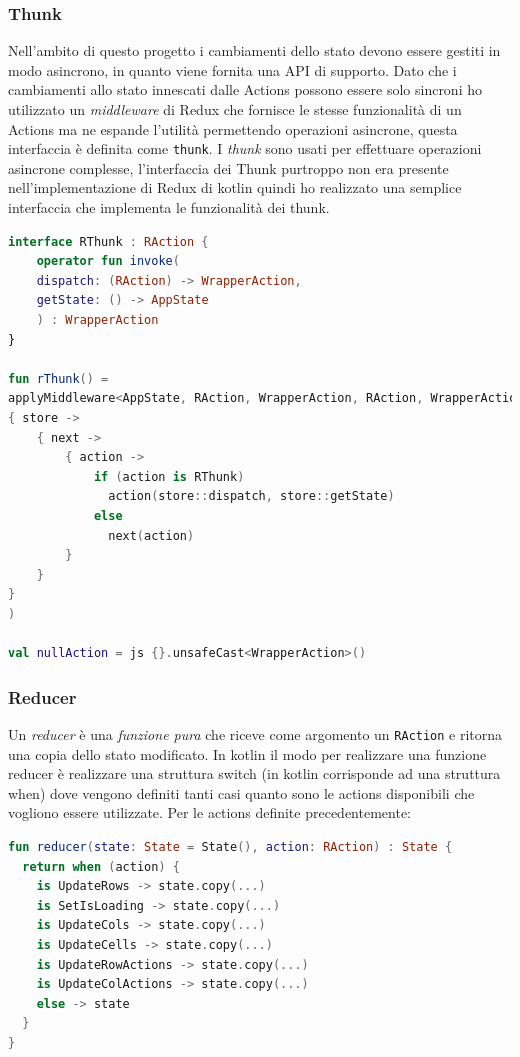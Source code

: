 \subsubsection*{Thunk}
Nell'ambito di questo progetto i cambiamenti dello stato devono essere gestiti in modo asincrono, in quanto viene fornita una API di supporto. Dato che i cambiamenti allo stato innescati dalle Actions possono essere solo sincroni ho utilizzato un \emph{middleware} di Redux che fornisce le stesse funzionalità di un Actions ma ne espande l'utilità permettendo operazioni asincrone, questa interfaccia è definita come \verb|thunk|.
I \emph{thunk} sono usati per effettuare operazioni asincrone complesse, l'interfaccia dei Thunk purtroppo non era presente nell'implementazione di Redux di kotlin quindi ho realizzato una semplice interfaccia che implementa le funzionalità dei thunk.
\begin{lstlisting}[caption={Interfaccia Thunk}, label={lst:bodycells}, language=Kotlin]
interface RThunk : RAction {
	operator fun invoke(
	dispatch: (RAction) -> WrapperAction,
	getState: () -> AppState
	) : WrapperAction
}

fun rThunk() =
applyMiddleware<AppState, RAction, WrapperAction, RAction, WrapperAction>(
{ store ->
	{ next ->
		{ action ->
			if (action is RThunk)
			  action(store::dispatch, store::getState)
			else
			  next(action)
		}
	}
}
)

val nullAction = js {}.unsafeCast<WrapperAction>()
\end{lstlisting}

\subsubsection*{Reducer}
Un \emph{reducer} è una \emph{funzione pura} che riceve come argomento un \verb|RAction| e ritorna una copia dello stato modificato. In kotlin il modo per realizzare una funzione reducer è realizzare una struttura switch (in kotlin corrisponde ad una struttura when) dove vengono definiti tanti casi quanto sono le actions disponibili che vogliono essere utilizzate. Per le actions definite precedentemente:
\begin{lstlisting}[caption={Interfaccia Thunk}, label={lst:bodycells}, language=Kotlin]
fun reducer(state: State = State(), action: RAction) : State {
  return when (action) {
    is UpdateRows -> state.copy(...)
    is SetIsLoading -> state.copy(...)
    is UpdateCols -> state.copy(...)
    is UpdateCells -> state.copy(...)
    is UpdateRowActions -> state.copy(...)
    is UpdateColActions -> state.copy(...)
    else -> state
  }
}
\end{lstlisting}


